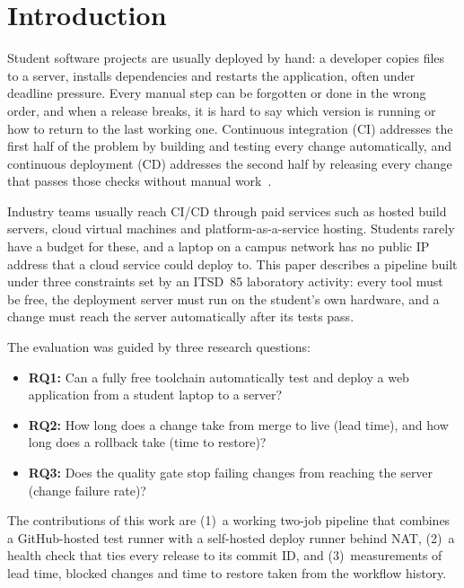 \documentclass[conference]{IEEEtran}
\begin{document}
\section{Introduction}
Student software projects are usually deployed by hand: a developer copies files to a server, installs dependencies and restarts the application, often under deadline pressure. Every manual step can be forgotten or done in the wrong order, and when a release breaks, it is hard to say which version is running or how to return to the last working one. Continuous integration (CI) addresses the first half of the problem by building and testing every change automatically, and continuous deployment (CD) addresses the second half by releasing every change that passes those checks without manual work~\cite{humble2010,fowler2006}.

Industry teams usually reach CI/CD through paid services such as hosted build servers, cloud virtual machines and platform-as-a-service hosting. Students rarely have a budget for these, and a laptop on a campus network has no public IP address that a cloud service could deploy to. This paper describes a pipeline built under three constraints set by an ITSD~85 laboratory activity: every tool must be free, the deployment server must run on the student's own hardware, and a change must reach the server automatically after its tests pass.

The evaluation was guided by three research questions:
\begin{itemize}
\item \textbf{RQ1:} Can a fully free toolchain automatically test and deploy a web application from a student laptop to a server?
\item \textbf{RQ2:} How long does a change take from merge to live (lead time), and how long does a rollback take (time to restore)?
\item \textbf{RQ3:} Does the quality gate stop failing changes from reaching the server (change failure rate)?
\end{itemize}

The contributions of this work are (1)~a working two-job pipeline that combines a GitHub-hosted test runner with a self-hosted deploy runner behind NAT, (2)~a health check that ties every release to its commit ID, and (3)~measurements of lead time, blocked changes and time to restore taken from the workflow history.

\end{document}
